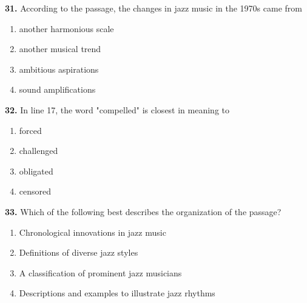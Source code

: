 \documentclass[12pt]{article}
\begin{document}
\vspace{0.25\baselineskip}
\noindent\textbf{31.} According to the passage, the changes in jazz music in the 1970s came from
\begin{enumerate}[label=(\Alph*),leftmargin=*,itemsep=0.2em]
\item another harmonious scale
\item another musical trend
\item ambitious aspirations
\item sound amplifications
\end{enumerate}
\par
\vspace{0.25\baselineskip}
\noindent\textbf{32.} In line 17, the word "compelled" is closest in meaning to
\begin{enumerate}[label=(\Alph*),leftmargin=*,itemsep=0.2em]
\item forced
\item challenged
\item obligated
\item censored
\end{enumerate}
\par
\vspace{0.25\baselineskip}
\noindent\textbf{33.} Which of the following best describes the organization of the passage?
\begin{enumerate}[label=(\Alph*),leftmargin=*,itemsep=0.2em]
\item Chronological innovations in jazz music
\item Definitions of diverse jazz styles
\item A classification of prominent jazz musicians
\item Descriptions and examples to illustrate jazz rhythms
\end{enumerate}
\par
\vspace{0.25\baselineskip}
\end{document}
